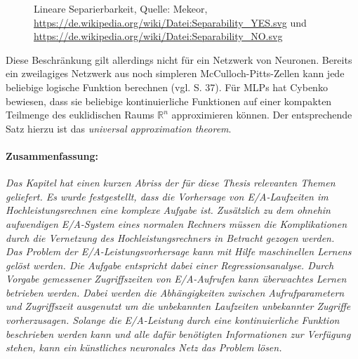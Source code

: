 \documentclass[
	12pt,
	a4paper,
	BCOR10mm,
	DIV14,
	listof=totoc,
	bibliography=totoc,
	headsepline
]{scrreprt}
\begin{document}
\begin{figure}
	\hfill
	\caption{Lineare Separierbarkeit, Quelle: Mekeor, \url{https://de.wikipedia.org/wiki/Datei:Separability_YES.svg} und \url{https://de.wikipedia.org/wiki/Datei:Separability_NO.svg}}
	\label{fig:separierbarkeit}
\end{figure} 

Diese Beschränkung gilt allerdings nicht für ein Netzwerk von Neuronen. Bereits ein zweilagiges Netzwerk aus noch simpleren McCulloch-Pitts-Zellen kann jede beliebige logische Funktion berechnen (vgl. \cite{Rojas:1996:NNS:235222} S. 37).
Für MLPs hat Cybenko \cite{cybenko:mcss} bewiesen, dass sie beliebige kontinuierliche Funktionen auf einer kompakten Teilmenge des euklidischen Raums $\mathbb{R}^n$ approximieren können. Der entsprechende Satz hierzu ist das \textit{universal approximation theorem}.

\bigskip
\paragraph{Zusammenfassung:}
\textit{ 
	Das Kapitel hat einen kurzen Abriss der für diese Thesis relevanten Themen geliefert. Es wurde festgestellt, dass die Vorhersage von E/A-Laufzeiten im Hochleistungsrechnen eine komplexe Aufgabe ist. Zusätzlich zu dem ohnehin aufwendigen E/A-System eines normalen Rechners müssen die Komplikationen durch die Vernetzung des Hochleistungsrechners in Betracht gezogen werden.\\
	Das Problem der E/A-Leistungsvorhersage kann mit Hilfe maschinellen Lernens gelöst werden. Die Aufgabe entspricht dabei einer Regressionsanalyse. Durch Vorgabe gemessener Zugriffszeiten von E/A-Aufrufen kann überwachtes Lernen betrieben werden. Dabei werden die Abhängigkeiten zwischen Aufrufparametern und Zugriffszeit ausgenutzt um die unbekannten Laufzeiten unbekannter Zugriffe vorherzusagen.
	Solange die E/A-Leistung durch eine kontinuierliche Funktion beschrieben werden kann und alle dafür benötigten Informationen zur Verfügung stehen, kann ein künstliches neuronales Netz das Problem lösen.
}
\end{document}

